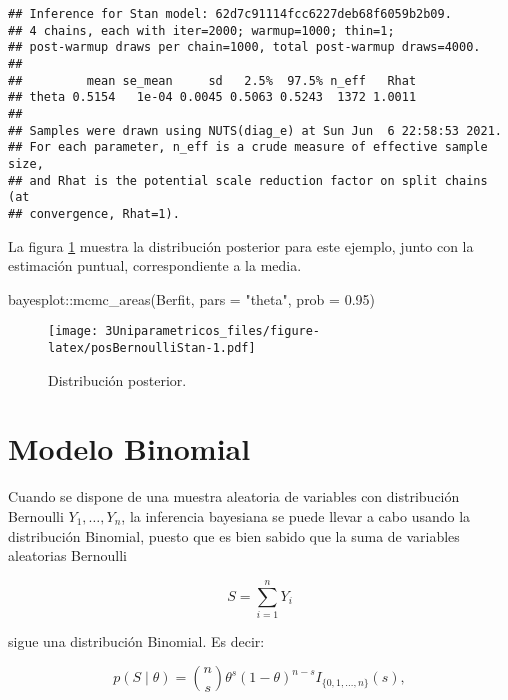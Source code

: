 \documentclass[
  10pt,
  spanish,
]{book}
\newenvironment{Shaded}{\begin{snugshade}}{\end{snugshade}}
\newcommand{\AttributeTok}[1]{\textcolor[rgb]{0.77,0.63,0.00}{#1}}
\newcommand{\FloatTok}[1]{\textcolor[rgb]{0.00,0.00,0.81}{#1}}
\newcommand{\FunctionTok}[1]{\textcolor[rgb]{0.00,0.00,0.00}{#1}}
\newcommand{\NormalTok}[1]{#1}
\newcommand{\SpecialCharTok}[1]{\textcolor[rgb]{0.00,0.00,0.00}{#1}}
\newcommand{\StringTok}[1]{\textcolor[rgb]{0.31,0.60,0.02}{#1}}
\theoremstyle{definition}
\theoremstyle{definition}
\theoremstyle{definition}
\theoremstyle{definition}
\theoremstyle{remark}
\begin{document}
\begin{verbatim}
## Inference for Stan model: 62d7c91114fcc6227deb68f6059b2b09.
## 4 chains, each with iter=2000; warmup=1000; thin=1; 
## post-warmup draws per chain=1000, total post-warmup draws=4000.
## 
##         mean se_mean     sd   2.5%  97.5% n_eff   Rhat
## theta 0.5154   1e-04 0.0045 0.5063 0.5243  1372 1.0011
## 
## Samples were drawn using NUTS(diag_e) at Sun Jun  6 22:58:53 2021.
## For each parameter, n_eff is a crude measure of effective sample size,
## and Rhat is the potential scale reduction factor on split chains (at 
## convergence, Rhat=1).
\end{verbatim}

La figura \ref{fig:posBernoulliStan} muestra la distribución posterior para este ejemplo, junto con la estimación puntual, correspondiente a la media.

\begin{Shaded}
\begin{Highlighting}[]
\NormalTok{bayesplot}\SpecialCharTok{::}\FunctionTok{mcmc\_areas}\NormalTok{(Berfit, }\AttributeTok{pars =} \StringTok{"theta"}\NormalTok{, }
                      \AttributeTok{prob =} \FloatTok{0.95}\NormalTok{)}
\end{Highlighting}
\end{Shaded}

\begin{figure}
\centering
\texttt{[image: 3Uniparametricos\_files/figure-latex/posBernoulliStan-1.pdf]}
\caption{\label{fig:posBernoulliStan}Distribución posterior.}
\end{figure}

\hypertarget{modelo-binomial}{%
\section{Modelo Binomial}\label{modelo-binomial}}

Cuando se dispone de una muestra aleatoria de variables con distribución
Bernoulli \(Y_1,\ldots,Y_n\), la inferencia bayesiana se puede llevar a
cabo usando la distribución Binomial, puesto que es bien sabido que la
suma de variables aleatorias Bernoulli

\begin{equation*}
S=\sum_{i=1}^nY_i
\end{equation*}

sigue una distribución Binomial. Es decir:

\begin{equation}
p(S \mid \theta)=\binom{n}{s}\theta^s(1-\theta)^{n-s}I_{\{0,1,\ldots,n\}}(s),
\end{equation}
\end{document}
